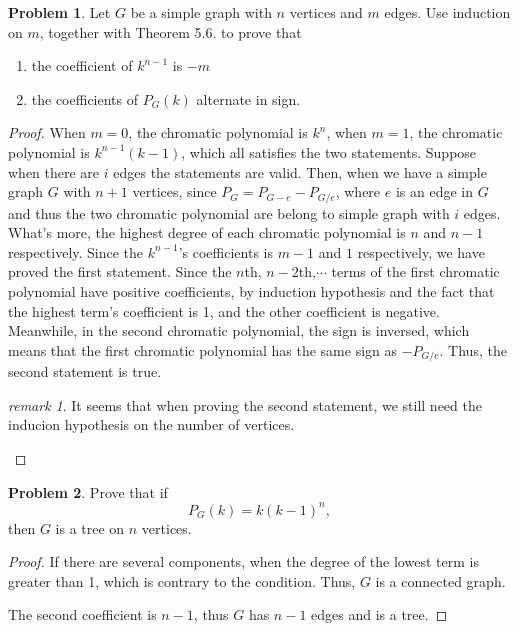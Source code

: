 \documentclass[a4paper,11pt]{article}%
\theoremstyle{remark}
\newtheorem*{remark}{remark}
\theoremstyle{definition}
\newtheorem{problem}{Problem}[subsection]
\begin{document}
\begin{problem}
    Let $G$ be a simple graph with $n$ vertices and $m$ edges. Use induction on $m$, together with Theorem 5.6. to prove that 
    \begin{enumerate}
        \item the coefficient of $k^{n-1}$ is $-m$
        \item the coefficients of $P_G(k)$ alternate in sign.
    \end{enumerate}
    \begin{proof}
       When $m=0$, the chromatic polynomial is $k^n$, when $m=1$, the chromatic polynomial is $k^{n-1}(k-1)$, which all satisfies the two 
       statements. Suppose when there are $i$ edges the statements are valid.
       Then, when we have a simple graph $G$ with $n+1$ vertices, since $P_G=P_{G-e}-P_{G/e}$, where $e$ is an edge in $G$ and thus 
       the two chromatic polynomial are belong to simple graph with $i$ edges. What's more, the highest degree of each chromatic polynomial is 
       $n$ and $n-1$ respectively. Since the $k^{n-1}$'s coefficients is $m-1$ and $1$ respectively, we have proved the first statement.
       Since the $n$th, $n-2$th,$\cdots$ terms of the first chromatic polynomial have positive coefficients, by induction hypothesis and 
       the fact that the highest term's coefficient is 1, and the other coefficient is negative. Meanwhile, in the second chromatic polynomial,
       the sign is inversed, which means that the first chromatic polynomial has the same sign as $-P_{G/e}$. Thus, the second statement is true.
       \begin{remark}
        It seems that when proving the second statement, we still need the inducion hypothesis on the number of vertices.
       \end{remark}
    \end{proof}
\end{problem}
\begin{problem}
    Prove that if 
    \[P_G(k)=k(k-1)^n,\]
    then $G$ is a tree on $n$ vertices.
    \begin{proof}
        If there are several components, when the degree of the lowest term is greater than 1, which is contrary to the condition.
        Thus, $G$ is a connected graph.

    The second coefficient is $n-1$, thus $G$ has $n-1$ edges and is a tree.
    \end{proof}
\end{problem}
\end{document}
